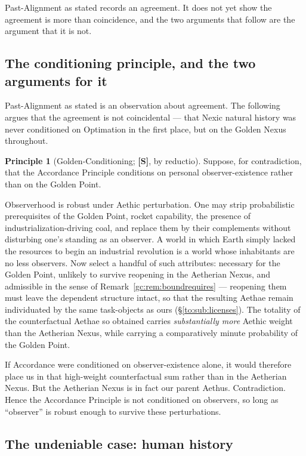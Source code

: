 \documentclass[11pt]{article}
\numberwithin{equation}{section}
\theoremstyle{plain}
\theoremstyle{definition}
\newtheorem{principle}{Principle}
\theoremstyle{remark}
\begin{document}
Past-Alignment as stated records an agreement. It does not yet show the
agreement is more than coincidence, and the two arguments that follow are the
argument that it is not.

\subsection{The conditioning principle, and the two arguments for it}\label{gc:sub:conditioning}

Past-Alignment as stated is an observation about agreement. The
following argues that the agreement is not coincidental --- that
Nexic natural history was never conditioned on Optimation in the first
place, but on the Golden Nexus throughout.

\begin{principle}[Golden-Conditioning; \textbf{[S]}, by reductio]
\label{gc:prin:conditioning}
Suppose, for contradiction, that the Accordance Principle conditions on
personal observer-existence rather than on the Golden Point.

Observerhood is robust under Aethic perturbation. One may strip
probabilistic prerequisites of the Golden Point, rocket capability,
the presence of industrialization-driving coal, and replace them by
their complements without disturbing one's standing as an observer. A
world in which Earth simply lacked the resources to begin an industrial
revolution is a world whose inhabitants are no less observers. Now select a handful of such attributes: necessary for the Golden Point,
unlikely to survive reopening in the Aetherian Nexus, and admissible in
the sense of Remark~\ref{gc:rem:boundrequires} --- reopening them must
leave the dependent structure intact, so that the resulting Aethae
remain individuated by the same task-objects as ours
(\S\ref{to:sub:licenses}). The totality of
the counterfactual Aethae so obtained carries \emph{substantially more}
Aethic weight than the Aetherian Nexus, while carrying a comparatively
minute probability of the Golden Point.

If Accordance were conditioned on observer-existence alone, it would
therefore place us in that high-weight counterfactual sum rather than in
the Aetherian Nexus. But the Aetherian Nexus is in fact our parent
Aethus. Contradiction. Hence the Accordance Principle is not conditioned
on observers, so long as ``observer'' is robust enough to survive these
perturbations.
\end{principle}

\subsection{The undeniable case: human history}\label{gc:sub:humanhistory}
\end{document}
